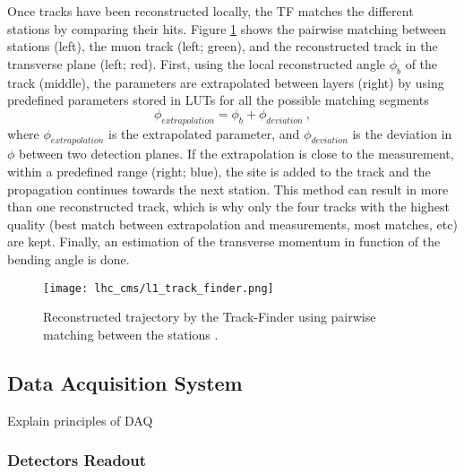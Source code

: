                     Once tracks have been reconstructed locally, the TF matches the different stations by comparing their hits. Figure \ref{fig:trigger_system_and_reconstruction_algorithms__dt_global} shows the pairwise matching between stations (left), the muon track (left; green), and the reconstructed track in the transverse plane (left; red). First, using the local reconstructed angle $ \phi_b $ of the track (middle), the parameters are extrapolated between layers (right) by using predefined parameters stored in LUTs for all the possible matching segments
                    \begin{equation}
                        \phi_{extrapolation} = \phi_b + \phi_{deviation} \ ,
                    \end{equation}
                    where $ \phi_{extrapolation} $ is the extrapolated parameter, and $ \phi_{deviation} $ is the deviation in $ \phi $ between two detection planes. If the extrapolation is close to the measurement, within a predefined range (right; blue), the site is added to the track and the propagation continues towards the next station. This method can result in more than one reconstructed track, which is why only the four tracks with the highest quality (best match between extrapolation and measurements, most matches, etc) are kept. Finally, an estimation of the transverse momentum in function of the bending angle is done.
                    
                    \begin{figure}[h!]
                        \centering
                        \texttt{[image: lhc\_cms/l1\_track\_finder.png]}
                        \caption{Reconstructed trajectory by the Track-Finder using pairwise matching between the stations \Cite{CMS_at_LHC}.}
                        \label{fig:trigger_system_and_reconstruction_algorithms__dt_global}
                    \end{figure}

        \subsection{Data Acquisition System}

            Explain principles of DAQ

            \subsubsection{Detectors Readout}

